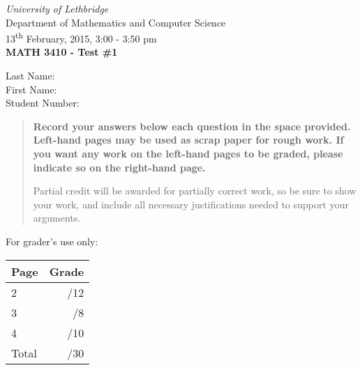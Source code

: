 \documentclass[12pt]{article}
\newcommand{\skipline}{\vspace{12pt}}
\begin{document}
\author{Instructor: Sean Fitzpatrick}
\thispagestyle{plain}
\begin{center}
\emph{University of Lethbridge}\\
Department of Mathematics and Computer Science\\
13\textsuperscript{th} February, 2015, 3:00 - 3:50 pm\\
{\bf MATH 3410 - Test \#1}\\
\end{center}
\skipline \skipline \skipline \noindent \skipline
Last Name:\underline{\hspace{50pt}{\bf Solutions}\hspace{248pt}}\\
\skipline
First Name:\underline{\hspace{50pt}{\bf The}\hspace{275pt}}\\
\skipline
Student Number:\underline{\hspace{323pt}}\\
\skipline



\vspace{0.5in}


\begin{quote}
 {\bf Record your answers below each question in the space provided.    Left-hand pages may be used as scrap paper for rough work.  If you want any work on the left-hand pages to be graded, please indicate so on the right-hand page.
 
 \bigskip
 
Partial credit will be awarded for partially correct work, so be sure to show your work, and include all necessary justifications needed to support your arguments.}
\end{quote}


\vspace{0.5in}

For grader's use only:

\begin{table}[hbt]
\begin{center}
\begin{tabular}{|l|r|} \hline
Page&Grade\\
\hline \hline
\cline{1-2} 2 & \enspace\enspace\enspace\enspace\enspace\enspace/12\\
\cline{1-2} 3 & \enspace\enspace\enspace\enspace\enspace\enspace/8\\
\cline{1-2} 4 & \enspace\enspace\enspace\enspace\enspace\enspace/10\\
\cline{1-2} Total & \enspace\enspace\enspace\enspace\enspace\enspace/30\\
\hline
\end{tabular}




\end{center}
\end{table}
\newpage
\end{document}
